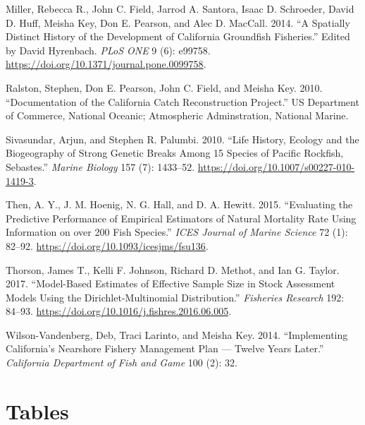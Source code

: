 \documentclass[11pt,
  english,
  a4paper,
]{article}
\begin{document}
\begin{cslreferences}
\leavevmode\hypertarget{ref-miller_spatially_2014}{}%
Miller, Rebecca R., John C. Field, Jarrod A. Santora, Isaac D. Schroeder, David D. Huff, Meisha Key, Don E. Pearson, and Alec D. MacCall. 2014. ``A Spatially Distinct History of the Development of California Groundfish Fisheries.'' Edited by David Hyrenbach. \emph{PLoS ONE} 9 (6): e99758. \url{https://doi.org/10.1371/journal.pone.0099758}.

\leavevmode\hypertarget{ref-ralston_documentation_2010}{}%
Ralston, Stephen, Don E. Pearson, John C. Field, and Meisha Key. 2010. ``Documentation of the California Catch Reconstruction Project.'' US Department of Commerce, National Oceanic; Atmospheric Adminstration, National Marine.

\leavevmode\hypertarget{ref-sivasundar_life_2010}{}%
Sivasundar, Arjun, and Stephen R. Palumbi. 2010. ``Life History, Ecology and the Biogeography of Strong Genetic Breaks Among 15 Species of Pacific Rockfish, Sebastes.'' \emph{Marine Biology} 157 (7): 1433--52. \url{https://doi.org/10.1007/s00227-010-1419-3}.

\leavevmode\hypertarget{ref-then_evaluating_2015}{}%
Then, A. Y., J. M. Hoenig, N. G. Hall, and D. A. Hewitt. 2015. ``Evaluating the Predictive Performance of Empirical Estimators of Natural Mortality Rate Using Information on over 200 Fish Species.'' \emph{ICES Journal of Marine Science} 72 (1): 82--92. \url{https://doi.org/10.1093/icesjms/fsu136}.

\leavevmode\hypertarget{ref-thorson_model-based_2017}{}%
Thorson, James T., Kelli F. Johnson, Richard D. Methot, and Ian G. Taylor. 2017. ``Model-Based Estimates of Effective Sample Size in Stock Assessment Models Using the Dirichlet-Multinomial Distribution.'' \emph{Fisheries Research} 192: 84--93. \url{https://doi.org/10.1016/j.fishres.2016.06.005}.

\leavevmode\hypertarget{ref-wilson-vandenberg_implementing_2014}{}%
Wilson-Vandenberg, Deb, Traci Larinto, and Meisha Key. 2014. ``Implementing California's Nearshore Fishery Management Plan --- Twelve Years Later.'' \emph{California Department of Fish and Game} 100 (2): 32.
\end{cslreferences}

\leavevmode\tagmcend\tagstructend

\clearpage


\hypertarget{tables}{%
\section{Tables}\label{tables}}
\end{document}
